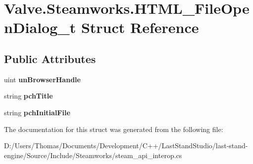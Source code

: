 \hypertarget{structValve_1_1Steamworks_1_1HTML__FileOpenDialog__t}{}\section{Valve.\+Steamworks.\+H\+T\+M\+L\+\_\+\+File\+Open\+Dialog\+\_\+t Struct Reference}
\label{structValve_1_1Steamworks_1_1HTML__FileOpenDialog__t}
\subsection*{Public Attributes}
\begin{DoxyCompactItemize}
\item 
\hypertarget{structValve_1_1Steamworks_1_1HTML__FileOpenDialog__t_ae4d421f56499fae7352cc496b5e80fca}{}uint {\bfseries un\+Browser\+Handle}\label{structValve_1_1Steamworks_1_1HTML__FileOpenDialog__t_ae4d421f56499fae7352cc496b5e80fca}

\item 
\hypertarget{structValve_1_1Steamworks_1_1HTML__FileOpenDialog__t_a2a45b8461f46c638c0d35df32e98f106}{}string {\bfseries pch\+Title}\label{structValve_1_1Steamworks_1_1HTML__FileOpenDialog__t_a2a45b8461f46c638c0d35df32e98f106}

\item 
\hypertarget{structValve_1_1Steamworks_1_1HTML__FileOpenDialog__t_a264cec6c0c3007d18ff24bd757724f4c}{}string {\bfseries pch\+Initial\+File}\label{structValve_1_1Steamworks_1_1HTML__FileOpenDialog__t_a264cec6c0c3007d18ff24bd757724f4c}

\end{DoxyCompactItemize}


The documentation for this struct was generated from the following file\+:\begin{DoxyCompactItemize}
\item 
D\+:/\+Users/\+Thomas/\+Documents/\+Development/\+C++/\+Last\+Stand\+Studio/last-\/stand-\/engine/\+Source/\+Include/\+Steamworks/steam\+\_\+api\+\_\+interop.\+cs\end{DoxyCompactItemize}
